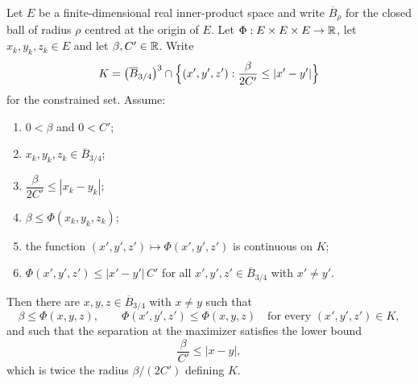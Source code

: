 \begin{lemma}
Let $E$ be a finite-dimensional real inner-product space and write
$\overline B_\rho$ for the closed ball of radius $\rho$ centred at the origin of
$E$. Let $\Phi:E\times E\times E\to\mathbb{R}$, let $x_k,y_k,z_k\in E$ and let
$\beta,C'\in\mathbb{R}$. Write
\[
  K=\bigl(\overline B_{3/4}\bigr)^3
     \cap\Bigl\{(x',y',z'):\frac{\beta}{2C'}\le|x'-y'|\Bigr\}
\]
for the constrained set. Assume:
\begin{enumerate}
\item\label{it:ctpm-pos} $0<\beta$ and $0<C'$;
\item\label{it:ctpm-adm} $x_k,y_k,z_k\in\overline B_{3/4}$;
\item\label{it:ctpm-sep} $\dfrac{\beta}{2C'}\le|x_k-y_k|$;
\item\label{it:ctpm-val} $\beta\le\Phi(x_k,y_k,z_k)$;
\item\label{it:ctpm-cont} the function $(x',y',z')\mapsto\Phi(x',y',z')$ is
continuous on $K$;
\item\label{it:ctpm-ub} $\Phi(x',y',z')\le|x'-y'|\,C'$ for all
$x',y',z'\in\overline B_{3/4}$ with $x'\ne y'$.
\end{enumerate}
Then there are $x,y,z\in\overline B_{3/4}$ with $x\ne y$ such that
\begin{equation}\label{eq:ctpm-max}
  \beta\le\Phi(x,y,z),
  \qquad
  \Phi(x',y',z')\le\Phi(x,y,z)\quad\text{for every }(x',y',z')\in K,
\end{equation}
and such that the separation at the maximizer satisfies the lower bound
\begin{equation}\label{eq:ctpm-rlow}
  \frac{\beta}{C'}\le|x-y| ,
\end{equation}
which is twice the radius $\beta/(2C')$ defining $K$.
\end{lemma}

